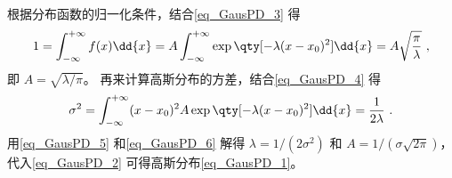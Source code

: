 根据分布函数的归一化条件，结合\autoref{eq_GausPD_3} 得
\begin{equation}\label{eq_GausPD_5}
1 = \int_{-\infty}^{+\infty} f(x) \dd{x}  = A\int_{-\infty}^{+\infty} \exp\qty[-\lambda (x - x_0)^2] \dd{x}  = A\sqrt{\frac{\pi}{\lambda}}~,
\end{equation}
即 $A = \sqrt{\lambda/\pi}$。 再来计算高斯分布的方差，结合\autoref{eq_GausPD_4} 得
\begin{equation}\label{eq_GausPD_6}
\sigma ^2 = \int_{-\infty}^{+\infty} (x - x_0)^2 A\exp\qty[-\lambda (x - x_0)^2] \dd{x}  = \frac{1}{2\lambda}~.
\end{equation}
用\autoref{eq_GausPD_5} 和\autoref{eq_GausPD_6} 解得 $\lambda = 1/(2\sigma^2)$ 和 $A = 1/(\sigma\sqrt{2\pi})$，代入\autoref{eq_GausPD_2} 可得高斯分布\autoref{eq_GausPD_1}。